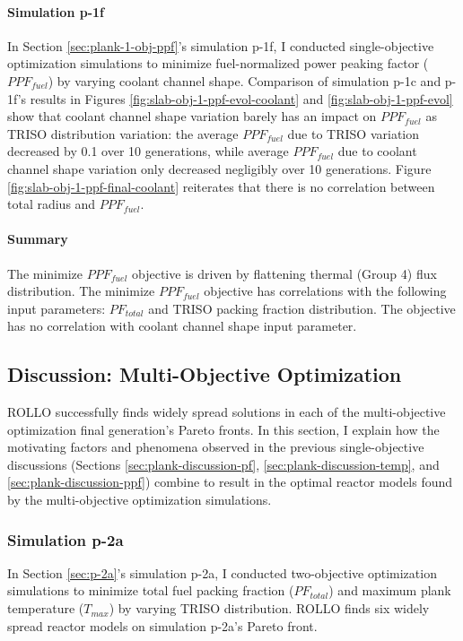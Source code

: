 \paragraph{Simulation p-1f}
In Section \ref{sec:plank-1-obj-ppf}'s simulation p-1f, I conducted single-objective 
optimization simulations to minimize fuel-normalized power peaking factor ($PPF_{fuel}$) 
by varying coolant channel shape.
Comparison of simulation p-1c and p-1f's results in Figures 
\ref{fig:slab-obj-1-ppf-evol-coolant} and \ref{fig:slab-obj-1-ppf-evol}
show that coolant channel shape variation barely has an impact on $PPF_{fuel}$ as 
\gls{TRISO} distribution variation: the average $PPF_{fuel}$ due to \gls{TRISO} 
variation decreased by 0.1 over 10 generations, while average $PPF_{fuel}$ due to 
coolant channel shape variation only decreased negligibly over 10 generations. 
Figure \ref{fig:slab-obj-1-ppf-final-coolant} reiterates that there is no correlation 
between total radius and $PPF_{fuel}$. 

\paragraph{Summary}
The minimize $PPF_{fuel}$ objective is driven by flattening thermal (Group 4) flux 
distribution. 
The minimize $PPF_{fuel}$ objective has correlations with the following input parameters: 
$PF_{total}$ and TRISO packing fraction distribution. 
The objective has no correlation with coolant channel shape input parameter.

\subsection{Discussion: Multi-Objective Optimization}
\label{sec:plank-discussion-multi}
\gls{ROLLO} successfully finds widely spread solutions in each of the multi-objective 
optimization final generation's Pareto fronts.
In this section, I explain how the motivating factors and phenomena observed in 
the previous single-objective discussions (Sections 
\ref{sec:plank-discussion-pf}, \ref{sec:plank-discussion-temp}, and 
\ref{sec:plank-discussion-ppf}) combine to result in the optimal reactor models found 
by the multi-objective optimization simulations. 

\subsubsection{Simulation p-2a}
In Section \ref{sec:p-2a}'s simulation p-2a, I conducted two-objective 
optimization simulations to minimize total fuel packing fraction ($PF_{total}$) and 
maximum plank temperature ($T_{max}$) by varying TRISO distribution. 
\gls{ROLLO} finds six widely spread reactor models on simulation p-2a's Pareto 
front. 

